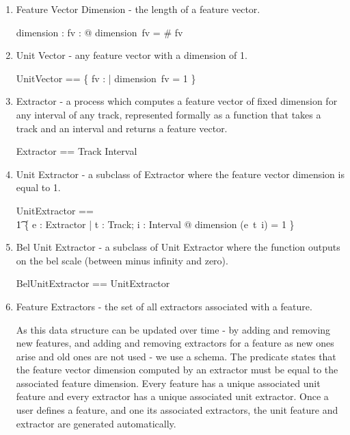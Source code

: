 \documentclass[11pt]{article}
\begin{document}
\begin{enumerate}
\item \textsf{Feature Vector Dimension} - the length of a feature vector. 

\begin{axdef}
	dimension : \FV \fun \nat
\where
	\forall fv : \FV @ dimension~fv = \# fv
\end{axdef}

\item \textsf{Unit Vector} - any feature vector with a dimension of 1.

\begin{zed}
	UnitVector == \{ fv : \FV | dimension~fv = 1 \}
\end{zed}

\item \textsf{Extractor} - a  process which computes a feature vector of fixed dimension for any interval of any track, represented formally as a function that takes a track and an interval and returns a feature vector.

\begin{zed}
	Extractor ==  Track \fun Interval \fun \FV 
\end{zed}

\item \textsf{Unit Extractor} - a subclass of Extractor where the feature vector dimension is equal to 1.

\begin{zed}
	UnitExtractor ==  \\
\t1		\{ e : Extractor | \forall t : Track; i : Interval @ dimension (e~t~i) = 1 \}  
\end{zed}

\item \textsf{Bel Unit Extractor} - a subclass of Unit Extractor where the function outputs on the bel scale (between minus infinity and zero). 

\begin{zed}
	BelUnitExtractor ==  UnitExtractor
\end{zed}

\item \textsf{Feature Extractors} - the set of  all extractors associated with a feature.

As this data structure can be updated over time -  by adding and removing new features, and adding and removing extractors for a feature as new ones arise and old ones are not used - we use a schema. The  predicate states that the feature vector dimension computed by an extractor must be equal to the associated feature dimension. Every feature has a unique associated unit feature  and every extractor has a unique associated unit extractor. Once a user defines a feature, and one its associated extractors, the unit feature and extractor are generated automatically.  


\end{enumerate}
\end{document}
